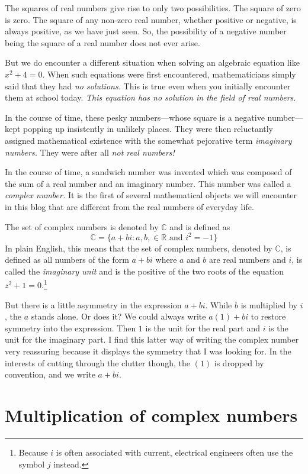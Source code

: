 \documentclass[
  a4paper,
]{article}
\begin{document}
The squares of real numbers give rise to only two possibilities. The
square of zero is zero. The square of any non-zero real number, whether
positive or negative, is always positive, as we have just seen. So, the
possibility of a negative number being the square of a real number does
not ever arise.

But we do encounter a different situation when solving an algebraic
equation like \(x^{2} + 4 = 0\). When such equations were first
encountered, mathematicians simply said that they had \emph{no
solutions.} This is true even when you initially encounter them at
school today. \emph{This equation has no solution in the field of real
numbers.}

In the course of time, these pesky numbers---whose square is a negative
number---kept popping up insistently in unlikely places. They were then
reluctantly assigned mathematical existence with the somewhat pejorative
term \emph{imaginary numbers.} They were after all \emph{not real
numbers!}

In the course of time, a sandwich number was invented which was composed
of the sum of a real number and an imaginary number. This number was
called a \emph{complex number.} It is the first of several mathematical
objects we will encounter in this blog that are different from the real
numbers of everyday life.

The set of complex numbers is denoted by \(\mathbb{C}\) and is defined
as \[
\mathbb{C} = \{a+bi: a, b, \in \mathbb{R} \mbox{ and } i^2 = -1\}
\] In plain English, this means that the set of complex numbers, denoted
by \(\mathbb{C}\), is defined as all numbers of the form \(a + bi\)
where \(a\) and \(b\) are real numbers and \(i\), is called the
\emph{imaginary unit} and is the positive of the two roots of the
equation \(z^2 + 1 = 0.\)\footnote{Because \(i\) is often associated
  with current, electrical engineers often use the symbol \(j\) instead.}

But there is a little asymmetry in the expression \(a + bi\). While
\(b\) is multiplied by \(i\), the \(a\) stands alone. Or does it? We
could always write \(a(1) + bi\) to restore symmetry into the
expression. Then \(1\) is the unit for the real part and \(i\) is the
unit for the imaginary part. I find this latter way of writing the
complex number very reassuring because it displays the symmetry that I
was looking for. In the interests of cutting through the clutter though,
the \((1)\) is dropped by convention, and we write \(a + bi\).

\hypertarget{multiplication-of-complex-numbers}{%
\section{Multiplication of complex
numbers}\label{multiplication-of-complex-numbers}}
\end{document}
